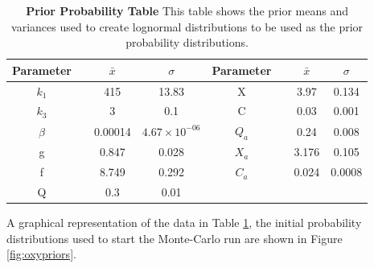 \begin{table}[h]%
\renewcommand{\arraystretch}{1.5}
\begin{center}
\begin{tabular}{cccc|cccc}
\toprule
\textbf{Parameter} && ${\bar{x}}$ & $\sigma$ & \textbf{Parameter} && ${\bar{x}}$ & $\sigma$\\
\midrule
$k_1$ && 415 & 13.83 & X && 3.97 & 0.134\\
$k_3$ && 3 & 0.1 & C && 0.03 & 0.001\\
$\beta$ && 0.00014 & $4.67\times 10^{-06}$ & $Q_a$ && 0.24 & 0.008 \\
g && 0.847 & 0.028 & $X_a$ && 3.176 & 0.105 \\
f && 8.749 & 0.292 & $C_a$ && 0.024 & 0.0008 \\
Q && 0.3 & 0.01\\
\bottomrule
\end{tabular}
\end{center}
\caption[First Prior Probability Table]{{\bf Prior Probability Table} This table shows the prior means and variances used to create lognormal distributions to be used as the prior probability distributions.
\label{tab:oxyProbstat}}
\end{table}

\noindent A graphical representation of the data in Table \ref{tab:oxyProbstat}, the initial probability distributions used to start the Monte-Carlo run are shown in Figure \ref{fig:oxypriors}.%

